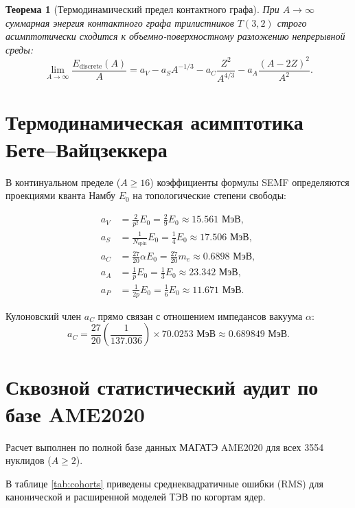 \documentclass[11pt,a4paper]{article}
\newtheorem{theorem}{Теорема}
\theoremstyle{definition}
\theoremstyle{remark}
\begin{document}
\begin{theorem}[Термодинамический предел контактного графа]
При $A \to \infty$ суммарная энергия контактного графа трилистников $T(3,2)$ строго асимптотически сходится к объемно-поверхностному разложению непрерывной среды:
\begin{equation}
    \lim_{A \to \infty} \frac{E_{\mathrm{discrete}}(A)}{A} = a_V - a_S A^{-1/3} - a_C \frac{Z^2}{A^{4/3}} - a_A \frac{(A-2Z)^2}{A^2}.
\end{equation}
\end{theorem}

\section{Термодинамическая асимптотика Бете--Вайцзеккера}
В континуальном пределе ($A \ge 16$) коэффициенты формулы SEMF определяются проекциями кванта Намбу $E_0$ на топологические степени свободы:

\begin{align}
    a_V &= \frac{2}{p^2} E_0 = \frac{2}{9} E_0 \approx \mathbf{15.561\text{ МэВ}}, \\
    a_S &= \frac{1}{N_{\mathrm{spin}}} E_0 = \frac{1}{4} E_0 \approx \mathbf{17.506\text{ МэВ}}, \\
    a_C &= \frac{27}{20} \alpha E_0 = \frac{27}{20} m_e \approx \mathbf{0.6898\text{ МэВ}}, \\
    a_A &= \frac{1}{p} E_0 = \frac{1}{3} E_0 \approx \mathbf{23.342\text{ МэВ}}, \\
    a_P &= \frac{1}{2p} E_0 = \frac{1}{6} E_0 \approx \mathbf{11.671\text{ МэВ}}.
\end{align}

Кулоновский член $a_C$ прямо связан с отношением импедансов вакуума $\alpha$:
\begin{equation}
    a_C = \frac{27}{20} \left(\frac{1}{137.036}\right) \times 70.0253\text{ МэВ} \approx \mathbf{0.689849\text{ МэВ}}.
\end{equation}

\section{Сквозной статистический аудит по базе AME2020}
Расчет выполнен по полной базе данных МАГАТЭ AME2020 для всех 3554 нуклидов ($A \ge 2$).

В таблице \ref{tab:cohorts} приведены среднеквадратичные ошибки (RMS) для канонической и расширенной моделей ТЭВ по когортам ядер.
\end{document}
